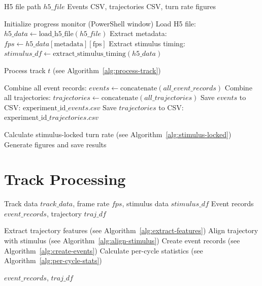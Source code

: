 \documentclass[
  11pt,
]{article}
\begin{document}
\begin{algorithm}[H]
\caption{Main Analysis Pipeline}
\label{alg:main}
\begin{algorithmic}[1]
\REQUIRE H5 file path $h5\_file$
\ENSURE Events CSV, trajectories CSV, turn rate figures

\STATE Initialize progress monitor (PowerShell window)
\STATE Load H5 file: $h5\_data \leftarrow \text{load\_h5\_file}(h5\_file)$
\STATE Extract metadata: $fps \leftarrow h5\_data[\text{metadata}][\text{fps}]$
\STATE Extract stimulus timing: $stimulus\_df \leftarrow \text{extract\_stimulus\_timing}(h5\_data)$

    \STATE Process track $t$ (see Algorithm~\ref{alg:process-track})
\ENDFOR

\STATE Combine all event records: $events \leftarrow \text{concatenate}(all\_event\_records)$
\STATE Combine all trajectories: $trajectories \leftarrow \text{concatenate}(all\_trajectories)$
\STATE Save $events$ to CSV: $\text{experiment\_id}\_events.csv$
\STATE Save $trajectories$ to CSV: $\text{experiment\_id}\_trajectories.csv$

\STATE Calculate stimulus-locked turn rate (see Algorithm~\ref{alg:stimulus-locked})
\STATE Generate figures and save results
\end{algorithmic}
\end{algorithm}

\hypertarget{track-processing}{%
\section{Track Processing}\label{track-processing}}

\begin{algorithm}[H]
\caption{Process Single Track}
\label{alg:process-track}
\begin{algorithmic}[1]
\REQUIRE Track data $track\_data$, frame rate $fps$, stimulus data $stimulus\_df$
\ENSURE Event records $event\_records$, trajectory $traj\_df$

\STATE Extract trajectory features (see Algorithm~\ref{alg:extract-features})
\STATE Align trajectory with stimulus (see Algorithm~\ref{alg:align-stimulus})
\STATE Create event records (see Algorithm~\ref{alg:create-events})
\STATE Calculate per-cycle statistics (see Algorithm~\ref{alg:per-cycle-stats})

\RETURN $event\_records$, $traj\_df$
\end{algorithmic}
\end{algorithm}
\end{document}
